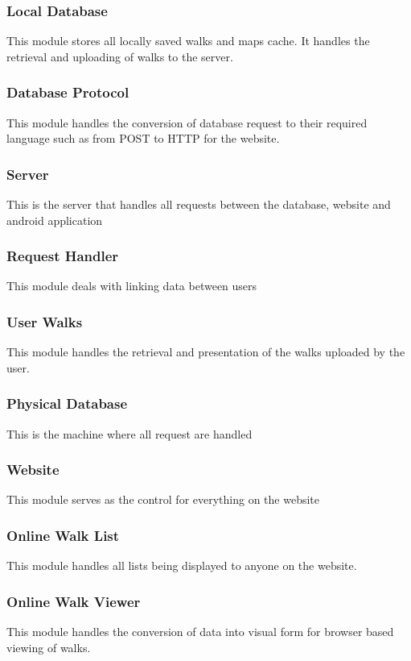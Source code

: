 \documentclass[12pt]{article}
\begin{document}
\subsubsection{Local Database}
\par{This module stores all locally saved walks and maps cache. It handles the retrieval and uploading of walks to the server.}
\subsubsection{Database Protocol}
This module handles the conversion of database request to their required language such as from POST to HTTP for the website.
\subsubsection{Server}
This is the server that handles all requests between the database, website and android application
\subsubsection{Request Handler}
\par{This module deals with linking data between users}
\subsubsection{User Walks}
This module handles the retrieval and presentation of the walks uploaded by the user.
\subsubsection{Physical Database}
\par{This is the machine where all request are handled}
\subsubsection{Website}
\par{This module serves as the control for everything on the website}
\subsubsection{Online Walk List}
This module handles all lists being displayed to anyone on the website.
\subsubsection{Online Walk Viewer}
This module handles the conversion of data into visual form for browser based viewing of walks.
\newpage
\end{document}
